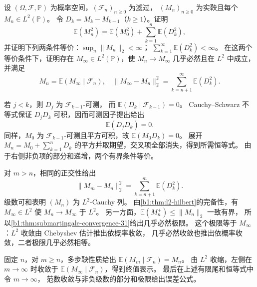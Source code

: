 \begin{exercise}\label{b1:ex:31-l2-increments}
设 \((\Omega,\mathcal F,\mathbb P)\) 为概率空间，\((\mathcal F_n)_{n\geq0}\) 为滤过，
\((M_n)_{n\geq0}\) 为实鞅且每个 \(M_n\in L^2(\mathbb P)\)。
令 \(D_k=M_k-M_{k-1}\)（\(k\geq1\)）。证明
\[
 \mathbb E(M_n^2)=\mathbb E(M_0^2)+\sum_{k=1}^n\mathbb E(D_k^2),
\]
并证明下列两条件等价：\(\sup_n\|M_n\|_2<\infty\)；
\(\sum_{k=1}^\infty\mathbb E(D_k^2)<\infty\)。
在这两个等价条件下，证明存在 \(M_\infty\in L^2(\mathbb P)\)，使
\(M_n\to M_\infty\) 几乎必然且在 \(L^2\) 中成立，并满足
\[
 M_n=\mathbb E(M_\infty\mid\mathcal F_n),\quad
 \|M_\infty-M_n\|_2^2=\sum_{k=n+1}^{\infty}\mathbb E(D_k^2).
\]
\end{exercise}
\begin{solution}
若 \(j<k\)，则 \(D_j\) 为 \(\mathcal F_{k-1}\)-可测，
而 \(\mathbb E(D_k\mid\mathcal F_{k-1})=0\)。
Cauchy--Schwarz 不等式保证 \(D_jD_k\) 可积，因而可测因子提出给出
\[
 \mathbb E(D_jD_k)=0.
\]
同样，\(M_0\) 为 \(\mathcal F_{k-1}\)-可测且平方可积，故 \(\mathbb E(M_0D_k)=0\)。
展开 \(M_n=M_0+\sum_{k=1}^nD_k\) 的平方并取期望，交叉项全部消失，得到所需恒等式。
由于右侧非负项的部分和递增，两个有界条件等价。

对 \(m>n\)，相同的正交性给出
\[
 \|M_m-M_n\|_2^2=\sum_{k=n+1}^m\mathbb E(D_k^2).
\]
级数可和表明 \((M_n)\) 为 \(L^2\)-Cauchy 列。
由\cref{b1:thm:l2-hilbert}的完备性，有 \(M_\infty\in L^2\) 使 \(M_n\to M_\infty\) 于 \(L^2\)。
另一方面，\(\mathbb E(M_n^+)\leq\|M_n\|_2\) 一致有界，
所以\cref{b1:thm:submartingale-convergence-31}给出几乎必然极限。
这个极限等于 \(M_\infty\)：\(L^2\) 收敛由 Chebyshev 估计推出依概率收敛，
几乎必然收敛也推出依概率收敛，二者极限几乎必然相等。

固定 \(n\)，对 \(m\geq n\)，多步鞅性质给出 \(\mathbb E(M_m\mid\mathcal F_n)=M_n\)。
由 \(L^2\) 收缩，左侧在 \(m\to\infty\) 时收敛于
\(\mathbb E(M_\infty\mid\mathcal F_n)\)，得到终值表示。
最后在上述有限尾和恒等式中令 \(m\to\infty\)，
范数收敛与非负级数的部分和极限给出误差公式。
\end{solution}


